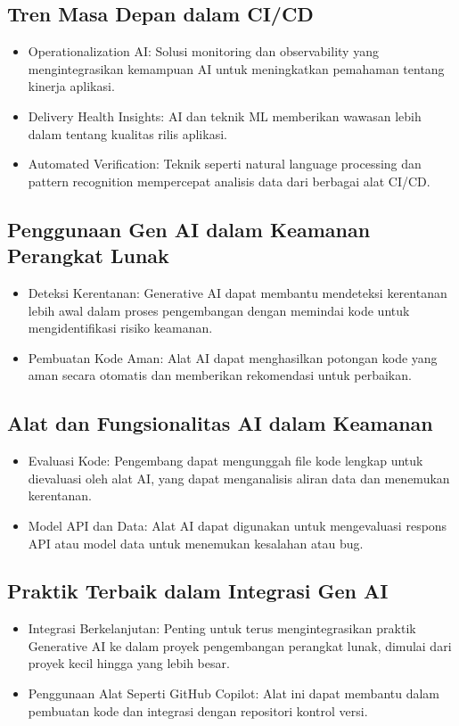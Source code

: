 \documentclass{article}
\begin{document}
\subsection{Tren Masa Depan dalam CI/CD}
\begin{itemize}
    \item Operationalization AI: Solusi monitoring dan observability yang mengintegrasikan kemampuan AI untuk meningkatkan pemahaman tentang kinerja aplikasi.
    \item Delivery Health Insights: AI dan teknik ML memberikan wawasan lebih dalam tentang kualitas rilis aplikasi.
    \item Automated Verification: Teknik seperti natural language processing dan pattern recognition mempercepat analisis data dari berbagai alat CI/CD.
\end{itemize}

\subsection{Penggunaan Gen AI dalam Keamanan Perangkat Lunak}
\begin{itemize}
    \item Deteksi Kerentanan: Generative AI dapat membantu mendeteksi kerentanan lebih awal dalam proses pengembangan dengan memindai kode untuk mengidentifikasi risiko keamanan.
    \item Pembuatan Kode Aman: Alat AI dapat menghasilkan potongan kode yang aman secara otomatis dan memberikan rekomendasi untuk perbaikan.
\end{itemize}

\subsection{Alat dan Fungsionalitas AI dalam Keamanan}
\begin{itemize}
    \item Evaluasi Kode: Pengembang dapat mengunggah file kode lengkap untuk dievaluasi oleh alat AI, yang dapat menganalisis aliran data dan menemukan kerentanan.
    \item Model API dan Data: Alat AI dapat digunakan untuk mengevaluasi respons API atau model data untuk menemukan kesalahan atau bug.
\end{itemize}

\subsection{Praktik Terbaik dalam Integrasi Gen AI}
\begin{itemize}
    \item Integrasi Berkelanjutan: Penting untuk terus mengintegrasikan praktik Generative AI ke dalam proyek pengembangan perangkat lunak, dimulai dari proyek kecil hingga yang lebih besar.
    \item Penggunaan Alat Seperti GitHub Copilot: Alat ini dapat membantu dalam pembuatan kode dan integrasi dengan repositori kontrol versi.
\end{itemize}
\end{document}
